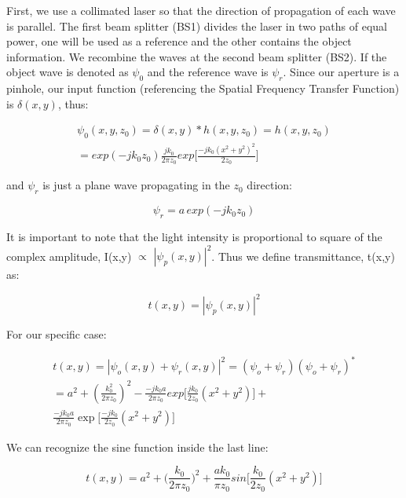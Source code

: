 \documentclass[12pt]{article}
\begin{document}
First, we use a collimated laser so that the direction of propagation of each wave is parallel.
The first beam splitter (BS1) divides the laser in two paths of equal power, one will be used as a reference and the other contains the object information.
We recombine the waves at the second beam splitter (BS2). If the object wave is denoted as \(\psi_{0}\) and the reference wave is \(\psi_{r}\).
Since our aperture is a pinhole, our input function (referencing the Spatial Frequency Transfer Function) is \(\delta(x,y)\), thus:

\begin{equation}
	\begin{multlined}
		\psi_{0}(x,y,z_{0}) = \delta(x,y) * h(x,y,z_{0}) = h(x,y,z_{0})
		\\= exp(-jk_{0}z_{0})\frac{jk_{0}}{2\pi z_{0}}exp\bigg[\frac{-jk_{0}(x^2 + y^2)^2}{2z_{0}}\bigg]
	\end{multlined}
\end{equation}

and \(\psi_{r}\) is just a plane wave propagating in the \(z_{0}\) direction:

\begin{equation}
	\psi_{r} = a\,exp(-jk_{0}z_{0})
\end{equation}

It is important to note that the light intensity is proportional to square of the complex amplitude, I(x,y) \(\propto\) \(|\psi_{p}(x,y)|^2\).
Thus we define transmittance, t(x,y) as:

\begin{equation}
	t(x,y) = |\psi_{p}(x,y)|^2
\end{equation}

For our specific case:

\begin{equation}
	\begin{multlined}
	t(x,y) = |\psi_{o}(x,y) + \psi_{r}(x,y)|^2
	=(\psi_{o} + \psi_{r})(\psi_{o} + \psi_{r})^*
	\\= a^2 + (\frac{k_{0}^2}{2\pi z_{0}})^2 - \frac{-jk_{0}a}{2\pi z_{0}}
	exp\bigg[ \frac{jk_{0}}{2z_{0}}(x^2 + y^2) \bigg] +
	\\\frac{-jk_{0}a}{2\pi z_{0}}
	\exp\bigg[\frac{-jk_{0}}{2z_{0}}(x^2 + y^2) \bigg]
	\end{multlined}
\end{equation}

We can recognize the sine function inside the last line:

\begin{equation}
	t(x,y) = a^2 + \big(\frac{k_{0}}{2\pi z_{0}}\big)^2 +
	\frac{ak_{0}}{\pi z_{0}}sin\bigg[\frac{k_{0}}{2z_{0}}(x^2 + y^2)\bigg]
\end{equation}
\end{document}
